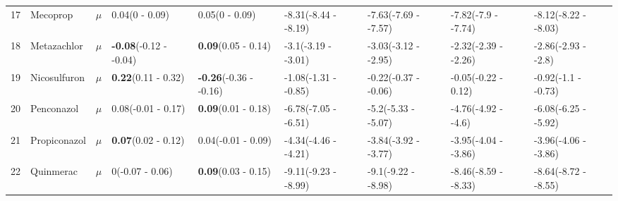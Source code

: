 \begin{longtable}{lp{2cm}p{0.6cm}p{1.8cm}p{1.8cm}p{1.8cm}p{1.8cm}p{1.8cm}p{1.8cm}}
  17 & Mecoprop & $\mu$ & 0.04\newline (0 - 0.09) & 0.05\newline (0 - 0.09) & -8.31\newline (-8.44 - -8.19) & -7.63\newline (-7.69 - -7.57) & -7.82\newline (-7.9 - -7.74) & -8.12\newline (-8.22 - -8.03) \\ 
  18 & Metazachlor & $\mu$ & \textbf{-0.08}\newline (-0.12 - -0.04) & \textbf{0.09}\newline (0.05 - 0.14) & -3.1\newline (-3.19 - -3.01) & -3.03\newline (-3.12 - -2.95) & -2.32\newline (-2.39 - -2.26) & -2.86\newline (-2.93 - -2.8) \\ 
  19 & Nicosulfuron & $\mu$ & \textbf{0.22}\newline (0.11 - 0.32) & \textbf{-0.26}\newline (-0.36 - -0.16) & -1.08\newline (-1.31 - -0.85) & -0.22\newline (-0.37 - -0.06) & -0.05\newline (-0.22 - 0.12) & -0.92\newline (-1.1 - -0.73) \\ 
  20 & Penconazol & $\mu$ & 0.08\newline (-0.01 - 0.17) & \textbf{0.09}\newline (0.01 - 0.18) & -6.78\newline (-7.05 - -6.51) & -5.2\newline (-5.33 - -5.07) & -4.76\newline (-4.92 - -4.6) & -6.08\newline (-6.25 - -5.92) \\ 
  21 & Propiconazol & $\mu$ & \textbf{0.07}\newline (0.02 - 0.12) & 0.04\newline (-0.01 - 0.09) & -4.34\newline (-4.46 - -4.21) & -3.84\newline (-3.92 - -3.77) & -3.95\newline (-4.04 - -3.86) & -3.96\newline (-4.06 - -3.86) \\ 
  22 & Quinmerac & $\mu$ & 0\newline (-0.07 - 0.06) & \textbf{0.09}\newline (0.03 - 0.15) & -9.11\newline (-9.23 - -8.99) & -9.1\newline (-9.22 - -8.98) & -8.46\newline (-8.59 - -8.33) & -8.64\newline (-8.72 - -8.55) \\ 

\end{longtable}
